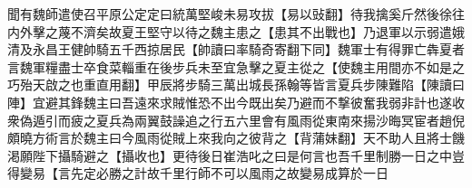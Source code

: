 聞有魏師遣使召平原公定定曰統萬堅峻未易攻拔【易以䜴翻】待我擒奚斤然後徐往内外擊之蔑不濟矣故夏王堅守以待之魏主患之【患其不出戰也】乃退軍以示弱遣娥清及永昌王健帥騎五千西掠居民【帥讀曰率騎奇寄翻下同】魏軍士有得罪亡犇夏者言魏軍糧盡士卒食菜輜重在後步兵未至宜急擊之夏主從之【使魏主用間亦不如是之巧殆天啟之也重直用翻】甲辰將步騎三萬出城長孫翰等皆言夏兵步陳難陷【陳讀曰陣】宜避其鋒魏主曰吾遠來求賊惟恐不出今既出矣乃避而不撃彼奮我弱非計也遂收衆偽遁引而疲之夏兵為兩翼鼓譟追之行五六里會有風雨從東南來揚沙晦冥宦者趙倪頗曉方術言於魏主曰今風雨從賊上來我向之彼背之【背蒲妹翻】天不助人且將士饑渇願陛下攝騎避之【攝收也】更待後日崔浩叱之曰是何言也吾千里制勝一日之中豈得變易【言先定必勝之計故千里行師不可以風雨之故變易成算於一日